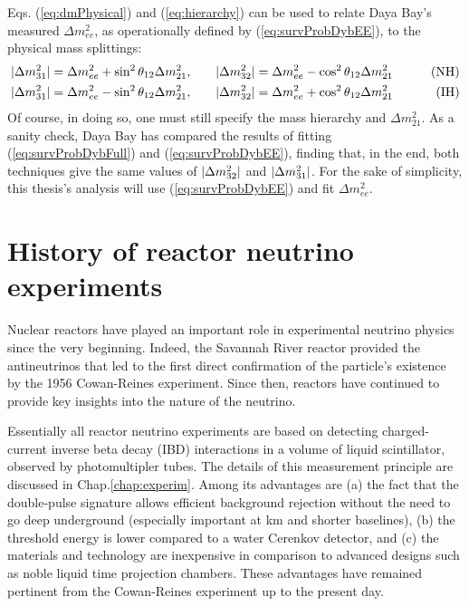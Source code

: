 \documentclass[../thesis.tex]{subfiles}
\begin{document}
Eqs. (\ref{eq:dmPhysical}) and (\ref{eq:hierarchy}) can be used to relate Daya
Bay's measured \(\Delta m^2_{ee}\), as operationally defined by
(\ref{eq:survProbDybEE}), to the physical mass splittings:
\begin{align*}
  \lvert \Delta m^2_{31}\rvert = \Delta m^2_{ee} + \sin^2 \theta_{12} \Delta m^2_{21}, \qquad
  & \lvert \Delta m^2_{32}\rvert = \Delta m^2_{ee} - \cos^2 \theta_{12} \Delta m^2_{21} \qquad
  & \text{(NH)}\\
  \lvert \Delta m^2_{31}\rvert = \Delta m^2_{ee} - \sin^2 \theta_{12} \Delta m^2_{21}, \qquad
  & \lvert \Delta m^2_{32}\rvert = \Delta m^2_{ee} + \cos^2 \theta_{12} \Delta m^2_{21} \qquad
  & \text{(IH)}
\end{align*}
Of course, in doing so, one must still specify the mass hierarchy and \(\Delta
m^2_{21}.\) As a sanity check, Daya Bay has compared the results of fitting
(\ref{eq:survProbDybFull}) and (\ref{eq:survProbDybEE}), finding that, in the
end, both techniques give the same values of \(\lvert \Delta m^2_{32}\rvert\) and
\(\lvert \Delta m^2_{31}\rvert\). For the sake of simplicity, this thesis's analysis
will use (\ref{eq:survProbDybEE}) and fit \(\Delta m^2_{ee}\).

\section{History of reactor neutrino experiments}
\label{sec:introReactor}

Nuclear reactors have played an important role in experimental neutrino physics
since the very beginning. Indeed, the Savannah River reactor provided the
antineutrinos that led to the first direct confirmation of the particle's
existence by the 1956 Cowan-Reines experiment. Since then, reactors have
continued to provide key insights into the nature of the neutrino.

Essentially all reactor neutrino experiments are based on detecting
charged-current inverse beta decay (IBD) interactions in a volume of liquid
scintillator, observed by photomultipler tubes. The details of this measurement
principle are discussed in Chap.\ref{chap:experim}. Among its advantages are (a)
the fact that the double-pulse signature allows efficient background rejection
without the need to go deep underground (especially important at km and shorter
baselines), (b) the threshold energy is lower compared to a water Cerenkov
detector, and (c) the materials and technology are inexpensive in comparison to
advanced designs such as noble liquid time projection chambers. These advantages
have remained pertinent from the Cowan-Reines experiment up to the present day.
\end{document}
